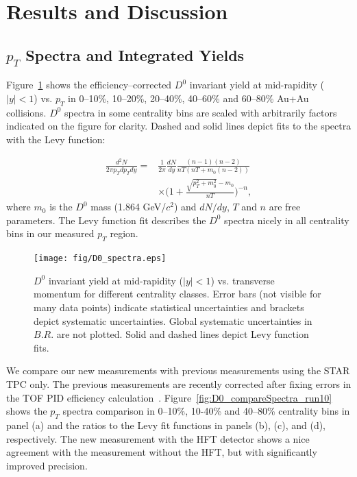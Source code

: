 \documentclass[%
 reprint,	
 amsmath,amssymb,
 aps,
 prc,
]{revtex4-1}
\begin{document}

\section{Results and Discussion}
\label{result}

\subsection{$p_{T}$ Spectra and Integrated Yields}
\label{result:pt}

Figure~\ref{fig:D0_spectra} shows the efficiency--corrected $D^0$ invariant yield at mid-rapidity ($|y|<1$) vs. $p_{T}$ in 0--10\%, 10--20\%, 20--40\%, 40--60\% and 60--80\% Au+Au collisions. $D^0$ spectra in some centrality bins are scaled with arbitrarily factors indicated on the figure for clarity. Dashed and solid lines depict fits to the spectra with the Levy function:

\begin{equation}
  \begin{aligned}
    \frac{d^2N}{2\pi p_{T}dp_{T}dy} = 
   & \frac{1}{2\pi}\frac{dN}{dy}\frac{(n-1)(n-2)}{nT(nT+m_0(n-2))} \\
  & \times \bigg(1+\frac{\sqrt{p_{T}^2+m_0^2}-m_0}{nT}\bigg)^{-n},
  \end{aligned}
\label{equ:equation4}
\end{equation}
where $m_0$ is the $D^0$ mass (1.864 GeV/$c^2$) and $dN/dy$, $T$ and $n$ are free parameters. The Levy function fit describes the $D^0$ spectra nicely in all centrality bins in our measured $p_T$ region.


\begin{figure}
\centering
\texttt{[image: fig/D0\_spectra.eps]}
\caption{$D^{0}$ invariant yield at mid-rapidity ($|y|<1$) vs. transverse momentum for different centrality classes. Error bars (not visible for many data points) indicate statistical uncertainties and brackets depict systematic uncertainties. Global systematic uncertainties in $B.R.$ are not plotted. Solid and dashed lines depict Levy function fits.}
\label{fig:D0_spectra} 
\end{figure}


We compare our new measurements with previous measurements using the STAR TPC only. The previous measurements are recently corrected after fixing errors in the TOF PID efficiency calculation~\cite{Star_D_RAA}. Figure~\ref{fig:D0_compareSpectra_run10} shows the $p_{T}$ spectra comparison in 0--10\%, 10-40\% and 40--80\% centrality bins in panel (a) and the ratios to the Levy fit functions in panels (b), (c), and (d), respectively. The new measurement with the HFT detector shows a nice agreement with the measurement without the HFT, but with significantly improved precision.
\end{document}
